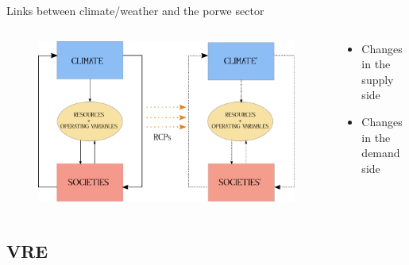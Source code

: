 \documentclass{beamer}%
\begin{document}
\begin{frame}[fragile]{Links between climate/weather and the porwe sector}
  \begin{columns}
    \begin{column}{0.7\textwidth}
  \begin{figure}
    \centering\includegraphics[scale=0.55]{drawing.pdf}
\end{figure}
  \end{column}
  \begin{column}{0.3\textwidth}
\small{    \begin{itemize}
    \item Changes in the \alert{supply} side
     \item Changes in the \alert{demand} side 
      \end{itemize}}
    \end{column}
    \end{columns}
\end{frame}


\subsection{VRE}
 
\end{document}

